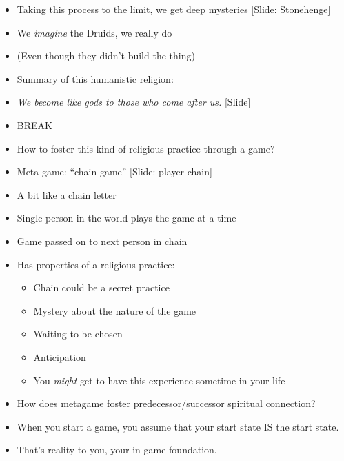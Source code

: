 \documentclass[12pt]{article}
\begin{document}
{\begin{itemize}
\item Taking this process to the limit, we get deep mysteries [Slide: Stonehenge]

\item We {\em imagine} the Druids, we really do

\item (Even though they didn't build the thing)

\item Summary of this humanistic religion:

\item {\em We become like gods to those who come after us.} [Slide]



\item BREAK

\item How to foster this kind of religious practice through a game?

\item Meta game:  ``chain game'' [Slide: player chain]

\item A bit like a chain letter

\item Single person in the world plays the game at a time

\item Game passed on to next person in chain

\item Has properties of a religious practice:
\begin{itemize}
\item Chain could be a secret practice
\item Mystery about the nature of the game
\item Waiting to be chosen
\item Anticipation
\item You {\em might} get to have this experience sometime in your life
\end{itemize}

\item How does metagame foster predecessor/successor spiritual connection?

\item When you start a game, you assume that your start state IS the start state.
\item That's reality to you, your in-game foundation.


\end{itemize}}
\end{document}
